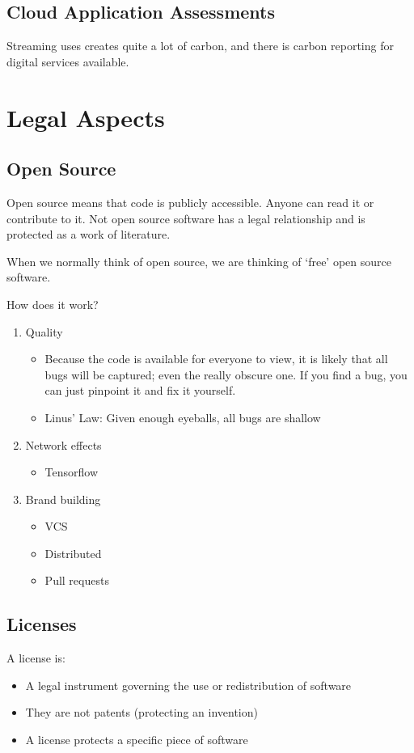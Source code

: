 \documentclass[11pt,a4paper,titlepage,dvipsnames,cmyk]{scrartcl}
\begin{document}
\subsection{Cloud Application Assessments}
Streaming uses creates quite a lot of carbon, and there is carbon reporting for digital services available.

\section{Legal Aspects}
\subsection{Open Source}
Open source means that code is publicly accessible. Anyone can read it or contribute to it. Not open source software has a legal relationship and is protected as a work of literature.

When we normally think of open source, we are thinking of `free' open source software.

How does it work?
\begin{enumerate}
\item Quality
\begin{itemize}
    \item Because the code is available for everyone to view, it is likely that all bugs will be captured; even the really obscure one. If you find a bug, you can just pinpoint it and fix it yourself.
    \item Linus' Law: Given enough eyeballs, all bugs are shallow
\end{itemize}
\item Network effects
\begin{itemize}
    \item Tensorflow
\end{itemize}
\item Brand building
\begin{itemize}
    \item VCS
    \item Distributed
    \item Pull requests
\end{itemize}
\end{enumerate}

\subsection{Licenses}
A license is:
\begin{itemize}
    \item A legal instrument governing the use or redistribution of software
    \item They are not patents (protecting an invention)
    \item A license protects a specific piece of software
\end{itemize}
\end{document}
